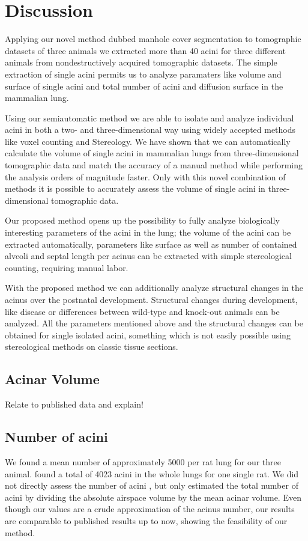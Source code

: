 \documentclass[twoside,paper=a4,abstract=true,english,DIVcalc]{scrartcl}
\begin{document}
\section{Discussion}
Applying our novel method dubbed manhole cover segmentation to tomographic datasets of three animals we extracted more than 40 acini for three different animals from nondestructively acquired tomographic datasets. The simple extraction of single acini permits us to analyze paramaters like volume and surface of single acini and total number of acini and diffusion surface in the mammalian lung.

Using our semiautomatic method we are able to isolate and analyze individual acini in both a two- and three-dimensional way using widely accepted methods like voxel counting and Stereology. We have shown that we can automatically calculate the volume of single acini in mammalian lungs from three-dimensional tomographic data and match the accuracy of a manual method while performing the analysis orders of magnitude faster. Only with this novel combination of methods it is possible to accurately assess the volume of single acini in three-dimensional tomographic data.

Our proposed method opens up the possibility to fully analyze biologically interesting parameters of the acini in the lung; the volume of the acini can be extracted automatically, parameters like surface as well as number of contained alveoli and septal length per acinus can be extracted with simple stereological counting, requiring manual labor.

With the proposed method we can additionally analyze structural changes in the acinus over the postnatal development. Structural changes during development, like disease or differences between wild-type and knock-out animals can be analyzed. All the parameters mentioned above and the structural changes can be obtained for single isolated acini, something which is not easily possible using stereological methods on classic tissue sections.

\subsection{Acinar Volume}
Relate to published data and explain!

\subsection{Number of acini}
We found a mean number of approximately 5000 per rat lung for our three animal. \citet[page 146]{Rodriguez1987} found a total of 4023 acini in the whole lungs for one single rat. We did not directly assess the number of acini , but only estimated the total number of acini by dividing the absolute airspace volume  by the mean acinar volume. Even though our values are a crude approximation of the acinus number, our results are comparable to published results up to now, showing the feasibility of our method.
\end{document}
